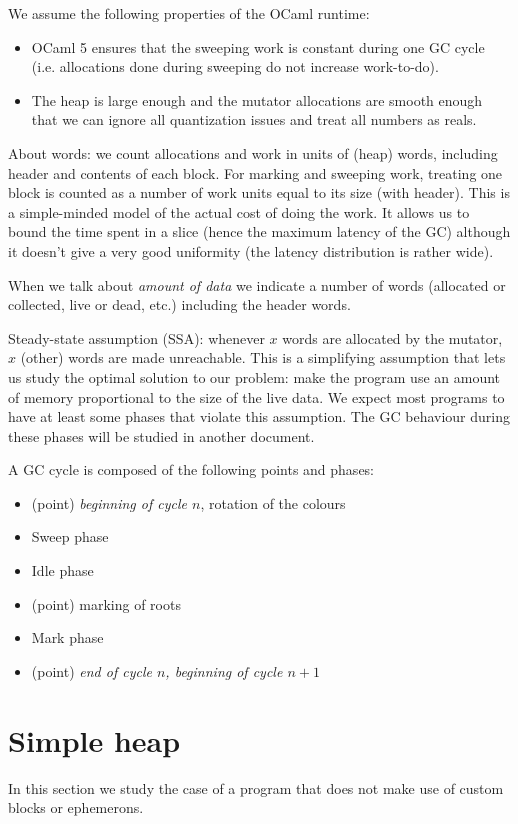 \documentclass{article}
\begin{document}
We assume the following properties of the OCaml runtime:
\begin{itemize}
\item OCaml 5 ensures that the sweeping work is constant during one GC cycle
(i.e. allocations done during sweeping do not increase work-to-do).
\item The heap is large enough and the mutator allocations are smooth
enough that we can ignore all quantization issues and treat all
numbers as reals.
\end{itemize}

About words: we count allocations and work in units of (heap) words,
including header and contents of each block. For marking and sweeping
work, treating one block is counted as a number of work units equal to
its size (with header). This is a simple-minded model of the actual
cost of doing the work. It allows us to bound the time spent in a
slice (hence the maximum latency of the GC) although it doesn't give a
very good uniformity (the latency distribution is rather wide).

When we talk about \emph{amount of data} we indicate a number of
words (allocated or collected, live or dead, etc.) including the
header words.

Steady-state assumption (SSA): whenever $x$
words are allocated by the mutator, $x$ (other) words are made
unreachable. This is a simplifying assumption that lets us study the
optimal solution to our problem: make the program use an amount of
memory proportional to the size of the live data. We expect most
programs to have at least some phases that violate this
assumption. The GC behaviour during these phases will be studied in
another document.

A GC cycle is composed of the following points and phases:
\begin{itemize}
\item (point) \emph{beginning of cycle $n$}, rotation of the colours
\item Sweep phase
\item Idle phase
\item (point) marking of roots
\item Mark phase
\item (point) \emph{end of cycle $n$, beginning of cycle $n+1$}
\end{itemize}

\section{Simple heap}
In this section we study the case of a program that does not make use
of custom blocks or ephemerons.
\end{document}
